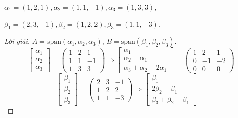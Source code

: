 \documentclass[class=linearalgebra,crop=false]{standalone}
\begin{document}
\begin{exercise}$\alpha_{1} = (1,2,1), \alpha_{2} = (1,1,-1), \alpha_{3} = (1,3,3)$,
    \par $\beta_{1} = (2,3,-1), \beta_{2} = (1,2,2), \beta_{3} = (1,1,-3)$.
\end{exercise}

\begin{proof}[Lời giải]$A = \text{span}(\alpha_{1},\alpha_{2},\alpha_{3})$, $B = \text{span}(\beta_{1},\beta_{2},\beta_{3})$.
    \[
        \begin{bmatrix}
            \alpha_{1} \\
            \alpha_{2} \\
            \alpha_{3}
        \end{bmatrix}=
        \begin{pmatrix}
            1 & 2 & 1  \\
            1 & 1 & -1 \\
            1 & 3 & 3
        \end{pmatrix}
        \Longrightarrow
        \begin{bmatrix}
            \alpha_{1}            \\
            \alpha_{2}-\alpha_{1} \\
            \alpha_{3}+\alpha_{2}-2\alpha_{1}
        \end{bmatrix}=
        \begin{pmatrix}
            1 & 2  & 1  \\
            0 & -1 & -2 \\
            0 & 0  & 0
        \end{pmatrix}
    \]
    \[
        \begin{bmatrix}
            \beta_{1} \\
            \beta_{2} \\
            \beta_{3}
        \end{bmatrix}=
        \begin{pmatrix}
            2 & 3 & -1 \\
            1 & 2 & 2  \\
            1 & 1 & -3
        \end{pmatrix}
        \Longrightarrow
        \begin{bmatrix}
            \beta_{1}            \\
            2\beta_{2}-\beta_{1} \\
            \beta_{3}+\beta_{2}-\beta_{1}
        \end{bmatrix}=
\]
\end{proof}
\end{document}
